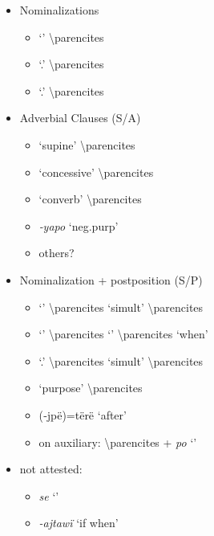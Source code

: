 \documentclass{memoir}
\begin{document}
\begin{itemize}
\tightlist
\item
  Nominalizations

  \begin{itemize}
  \tightlist
  \item
     `' \textbackslash parencites
  \item
     `.' \textbackslash parencites
  \item
     `.' \textbackslash parencites
  \end{itemize}
\item
  Adverbial Clauses (S/A)

  \begin{itemize}
  \tightlist
  \item
     `supine' \textbackslash parencites
  \item
     `concessive' \textbackslash parencites
  \item
     `converb' \textbackslash parencites
  \item
    \emph{‑yapo} `neg.purp'
  \item
    others?
  \end{itemize}
\item
  Nominalization + postposition (S/P)

  \begin{itemize}
  \tightlist
  \item
     `' \textbackslash parencites `simult'
    \textbackslash parencites
  \item
     `' \textbackslash parencites  `'
    \textbackslash parencites `when'
  \item
     `.' \textbackslash parencites
    `simult' \textbackslash parencites
  \item
     `purpose' \textbackslash parencites
  \item
    (‑jpë)=tërë `after'
  \item
    on auxiliary:  \textbackslash parencites + \emph{po}
    `'
  \end{itemize}
\item
  not attested:

  \begin{itemize}
  \tightlist
  \item
    \emph{se} `'
  \item
    \emph{-ajtawï} `if when'
  \end{itemize}
\end{itemize}
\end{document}
